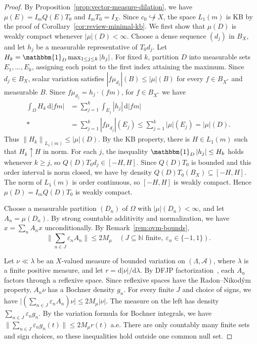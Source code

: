 \documentclass[11pt,leqno]{amsart}
\theoremstyle{compact}
\numberwithin{equation}{section}
\theoremstyle{compactremark}
\theoremstyle{compact}
\newcommand{\1}{\mathbbm{1}}
\newcommand{\rmd}{\mathrm{d}}
\newcommand{\N}{\mathbb{N}}
\newcommand{\norm}[1]{\left\|#1\right\|}
\newcommand{\abs}[1]{\left|#1\right|}
\begin{document}
\begin{proof}
By Proposition~\ref{prop:vector-measure-dilation}, we have $\mu(E)=I_mQ(E)T_0$ and $I_mT_0=I_X$. {Since $c_0\not\hookrightarrow X$, the space $L_1(m)$ is KB by the proof of Corollary~\ref{cor:review-minimal-kb}.} We first show that $\mu(D)$ is weakly compact whenever $\abs{\mu}(D)<\infty$. Choose a dense sequence $(d_j)$ in $B_X$, and let $h_j$ be a measurable representative of $T_0d_j$. Let $H_k=\1_D\max_{1\leq j\leq k}\abs{h_j}$. For fixed $k$, partition $D$ into measurable sets $E_1,\ldots,E_k$, assigning each point to the first index attaining the maximum. Since $d_j\in B_X$, scalar variation satisfies $\abs{f\mu_{d_j}}(B)\leq \abs{\mu}(B)$ for every $f\in B_{X^*}$ and measurable $B$. Since $f\mu_{d_j}=h_j\cdot(fm)$, for $f\in B_{X^*}$ we have
\begin{align*}
\int_\Omega H_k\,\rmd\abs{fm}
&=\sum_{j=1}^{k}\int_{E_j}\abs{h_j}\,\rmd\abs{fm}\\*
&=\sum_{j=1}^{k}\abs{f\mu_{d_j}}(E_j)
\leq\sum_{j=1}^{k}\abs{\mu}(E_j)=\abs{\mu}(D).
\end{align*}
Thus $\norm{H_k}_{L_1(m)}\leq \abs{\mu}(D)$. By the KB property, there is $H\in L_1(m)$ such that $H_k\uparrow H$ in norm. For each $j$, the inequality $\1_D\abs{h_j}\leq H_k$ holds whenever $k\geq j$, so $Q(D)T_0d_j\in[-H,H]$. Since $Q(D)T_0$ is bounded and this order interval is norm closed, we have by density $Q(D)T_0(B_X)\subseteq[-H,H]$. The norm of $L_1(m)$ is order continuous, so $[-H,H]$ is weakly compact. Hence $\mu(D)=I_mQ(D)T_0$ is weakly compact.

Choose a measurable partition $(D_n)$ of $\Omega$ with $\abs{\mu}(D_n)<\infty$, and let $A_n=\mu(D_n)$. By strong countable additivity and normalization, we have $x=\sum_nA_nx$ unconditionally. By Remark~\ref{rem:ovm-bounds},
\[
\Big\|\sum_{n\in J}\varepsilon_nA_n\Big\|\leq 2M_\mu
\quad(J\subseteq\N\text{ finite},\ \varepsilon_n\in\{-1,1\}).
\]

Let $\nu\ll\lambda$ be an $X$-valued measure of bounded variation on $(\Lambda,\mathcal A)$, where $\lambda$ is a finite positive measure, and let $r=\rmd\abs{\nu}/\rmd\lambda$. By DFJP factorization~\cite{DFJP1974}, each $A_n$ factors through a reflexive space. Since reflexive spaces have the Radon--Nikod\'ym property, $A_n\nu$ has a Bochner density $g_n$. For every finite $J$ and choice of signs, we have $\big|(\sum_{n\in J}\varepsilon_nA_n)\nu\big|\leq 2M_\mu\abs{\nu}$. The measure on the left has density $\sum_{n\in J}\varepsilon_ng_n$. By the variation formula for Bochner integrals, we have $\big\|\sum_{n\in J}\varepsilon_ng_n(t)\big\|\leq 2M_\mu r(t)$ a.e. There are only countably many finite sets and sign choices, so these inequalities hold outside one common null set.


\end{proof}
\end{document}
